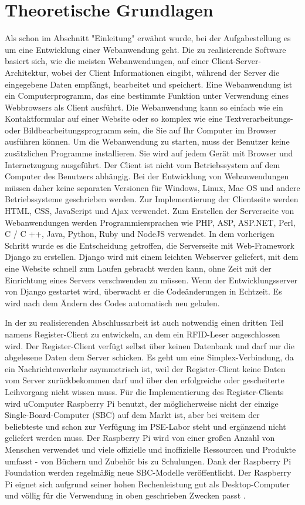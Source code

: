 \chapter{Theoretische Grundlagen}
\label{sec:theorie}
Als schon im Abschnitt "Einleitung" erwähnt wurde, bei der Aufgabestellung es um eine Entwicklung einer Webanwendung geht. Die zu realisierende Software basiert sich, wie die meisten Webanwendungen, auf einer Client-Server-Architektur, wobei der Client Informationen eingibt, während der Server die eingegebene Daten empfängt, bearbeitet und speichert. Eine Webanwendung ist ein Computerprogramm, das eine bestimmte Funktion unter Verwendung eines Webbrowsers als Client ausführt. Die Webanwendung kann so einfach wie ein Kontaktformular auf einer Website oder so komplex wie eine Textverarbeitungs- oder Bildbearbeitungsprogramm sein, die Sie auf Ihr Computer im Browser ausführen können. Um die Webanwendung zu starten, muss der Benutzer keine zusätzlichen Programme installieren. Sie wird auf jedem Gerät mit Browser und Internetzugang ausgeführt. Der Client ist nicht vom Betriebssystem auf dem Computer des Benutzers abhängig. Bei der Entwicklung von Webanwendungen müssen daher keine separaten Versionen für Windows, Linux, Mac OS und andere Betriebssysteme geschrieben werden. Zur Implementierung der Clientseite werden HTML, CSS, JavaScript und Ajax verwendet. Zum Erstellen der Serverseite von Webanwendungen werden Programmiersprachen wie PHP, ASP, ASP.NET, Perl, C / C ++, Java, Python, Ruby und NodeJS verwendet. In dem vorherigen Schritt wurde es die Entscheidung getroffen, die Serverseite mit Web-Framework Django zu erstellen. Django wird mit einem leichten Webserver geliefert, mit dem eine  Website schnell zum Laufen gebracht werden kann, ohne Zeit mit der Einrichtung eines Servers verschwenden zu müssen. Wenn der Entwicklungsserver von Django gestartet wird, überwacht er die Codeänderungen in Echtzeit. Es wird nach dem Ändern des Codes automatisch neu geladen.

In der zu realisierenden Abschlussarbeit ist auch notwendig einen dritten Teil namens Register-Client zu entwickeln, an dem ein RFID-Leser angeschlossen wird. Der Register-Client verfügt selbst über keinen Datenbank und darf nur die abgelesene Daten dem Server schicken. Es geht um eine Simplex-Verbindung, da ein Nachrichtenverkehr asymmetrisch ist, weil der Register-Client keine Daten vom Server zurückbekommen darf und über den erfolgreiche oder gescheiterte Leihvorgang nicht wissen muss. Für die Implementierung des Register-Clients wird uComputer Raspberry Pi benutzt, der möglicherweise nicht der einzige Single-Board-Computer (SBC) auf dem Markt ist, aber bei weitem der beliebteste und schon zur Verfügung im PSE-Labor steht und ergänzend nicht geliefert werden muss. Der Raspberry Pi wird von einer großen Anzahl von Menschen verwendet und viele offizielle und inoffizielle Ressourcen und Produkte umfasst - von Büchern und Zubehör bis zu Schulungen. Dank der Raspberry Pi Foundation werden regelmäßig neue SBC-Modelle veröffentlicht. Der Raspberry Pi eignet sich aufgrund seiner hohen Rechenleistung gut als Desktop-Computer und völlig für die Verwendung in oben geschrieben Zwecken passt . 

